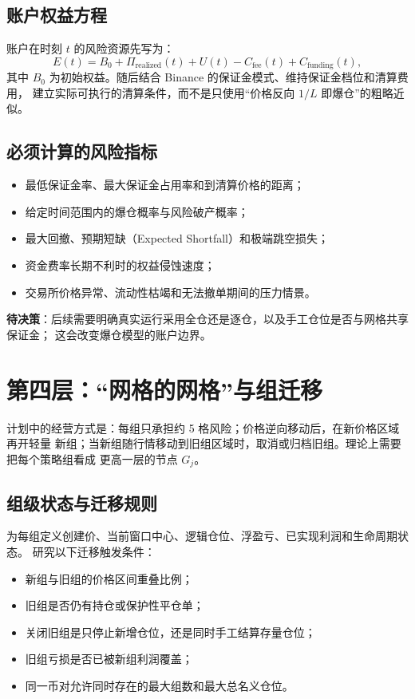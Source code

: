 \documentclass[11pt,a4paper,fontset=none]{ctexart}
\newcommand{\decisionitem}{\textcolor{ResearchRed}{\textbf{待决策}}}
\begin{document}
\subsection{账户权益方程}

账户在时刻 $t$ 的风险资源先写为：
\begin{equation}
  E(t)=B_0+\Pi_{\mathrm{realized}}(t)+U(t)
  -C_{\mathrm{fee}}(t)+C_{\mathrm{funding}}(t),
\end{equation}
其中 $B_0$ 为初始权益。随后结合 Binance 的保证金模式、维持保证金档位和清算费用，
建立实际可执行的清算条件，而不是只使用“价格反向 $1/L$ 即爆仓”的粗略近似。

\subsection{必须计算的风险指标}

\begin{itemize}
  \item 最低保证金率、最大保证金占用率和到清算价格的距离；
  \item 给定时间范围内的爆仓概率与风险破产概率；
  \item 最大回撤、预期短缺（Expected Shortfall）和极端跳空损失；
  \item 资金费率长期不利时的权益侵蚀速度；
  \item 交易所价格异常、流动性枯竭和无法撤单期间的压力情景。
\end{itemize}

\decisionitem：后续需要明确真实运行采用全仓还是逐仓，以及手工仓位是否与网格共享保证金；
这会改变爆仓模型的账户边界。

\section{第四层：“网格的网格”与组迁移}

计划中的经营方式是：每组只承担约 5 格风险；价格逆向移动后，在新价格区域再开轻量
新组；当新组随行情移动到旧组区域时，取消或归档旧组。理论上需要把每个策略组看成
更高一层的节点 $G_j$。

\subsection{组级状态与迁移规则}

为每组定义创建价、当前窗口中心、逻辑仓位、浮盈亏、已实现利润和生命周期状态。
研究以下迁移触发条件：

\begin{itemize}
  \item 新组与旧组的价格区间重叠比例；
  \item 旧组是否仍有持仓或保护性平仓单；
  \item 关闭旧组是只停止新增仓位，还是同时手工结算存量仓位；
  \item 旧组亏损是否已被新组利润覆盖；
  \item 同一币对允许同时存在的最大组数和最大总名义仓位。
\end{itemize}
\end{document}

